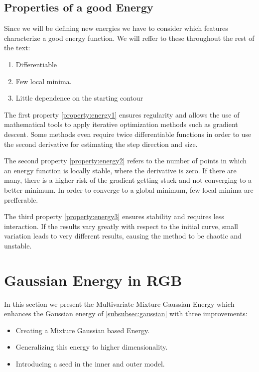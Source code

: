  \subsection*{Properties of a good Energy}
 Since we will be defining new energies we have to consider which features characterize a good energy function. We will reffer to these throughout the rest of the text: 

 \begin{enumerate}[label=\textbf{E.\arabic*}]
 	\item \label{property:energy1} Differentiable
 	\item \label{property:energy2} Few local minima.
 	\item \label{property:energy3} Little dependence on the starting contour
 	  
 \end{enumerate}
 The first property \ref{property:energy1} ensures regularity and allows the use of mathematical tools to apply iterative optimization methods such as gradient descent. Some methods even require twice differentiable functions in order to use the second derivative for estimating the step direction and size.
 
The second property \ref{property:energy2} refers to the number of points in which an energy function is locally stable, where the derivative is zero. If there are many, there is a higher risk of the gradient getting stuck and not converging to a better minimum. In order to converge to a global minimum, few local minima are prefferable.

The third property \ref{property:energy3} ensures stability and requires less interaction. If the results vary greatly with respect to the initial curve, small variation leads to very different results, causing the method to be chaotic and unstable.

 \section{Gaussian Energy in RGB}
 \label{subsubsec:multivariate_mixture_energy}
 \noindent

 
In this section we present the Multivariate Mixture Gaussian Energy which enhances the Gaussian energy of \ref{subsubsec:gaussian} with three improvements:
\begin{itemize}
	\item Creating a Mixture Gaussian based Energy.
	\item Generalizing this energy to higher dimensionality.
	\item Introducing a seed in the inner and outer model. 
\end{itemize}

